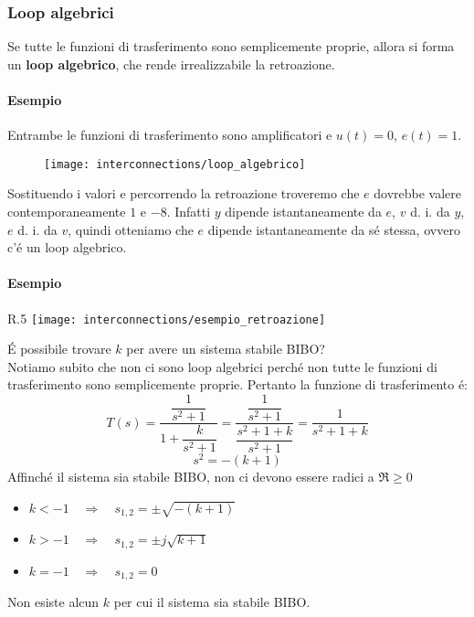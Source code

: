 \documentclass[../main.tex]{subfiles}
\begin{document}
	\subsubsection{Loop algebrici}
		Se tutte le funzioni di trasferimento sono semplicemente proprie, allora si forma un \textbf{loop algebrico}, che rende irrealizzabile la retroazione.
		
		\begin{mdframed}[style=Esempio]
			\paragraph{Esempio}
			Entrambe le funzioni di trasferimento sono amplificatori e $ u(t) = 0 $, $ e(t) =1 $.
			
			\begin{figure}[H]
				\centering
				\texttt{[image: interconnections/loop\_algebrico]}
			\end{figure}
		
			Sostituendo i valori e percorrendo la retroazione troveremo che $ e $ dovrebbe valere contemporaneamente $ 1 $ e $ -8 $. Infatti $ y $ dipende istantaneamente da $ e $, $ v $ d. i. da $ y $, $ e $ d. i. da $ v $, quindi otteniamo che $ e $ dipende istantaneamente da s\'e stessa, ovvero c'\'e un loop algebrico.
		\end{mdframed}
	
		\begin{mdframed}[style=Esempio]
			\paragraph{Esempio}
			\begin{wrapfigure}{R}{.5\linewidth}%
				\centering
				\texttt{[image: interconnections/esempio\_retroazione]}%
			\end{wrapfigure}
			\leavevmode%
			\'E possibile trovare $ k $ per avere un sistema stabile BIBO?\\
			Notiamo subito che non ci sono loop algebrici perch\'e non tutte le funzioni di trasferimento sono semplicemente proprie. Pertanto la funzione di trasferimento \'e:
			\[
				T(s) = \dfrac{\dfrac{1}{s^2+1}}{1 + \dfrac{k}{s^2+1}} =
				\dfrac{\dfrac{1}{s^2+1}}{\dfrac{s^2+1+k}{s^2+1}} = 
				\dfrac{1}{s^2+1+k}
			\]
			\[ 
				s^2 = -(k+1)
			\]
			Affinch\'e il sistema sia stabile BIBO, non ci devono essere radici a $ \Re \geq 0 $
			\begin{itemize}
				\item 
					$ k<-1 \quad \Rightarrow \quad s_{1,2} = \pm \sqrt{-(k+1)} $
				\item
					$ k>-1 \quad \Rightarrow \quad s_{1,2} = \pm j \sqrt{k+1} $
				\item 
					$ k=-1 \quad \Rightarrow \quad s_{1,2} = 0 $
			\end{itemize}
			Non esiste alcun $ k $ per cui il sistema sia stabile BIBO.
		\end{mdframed}

		
\end{document}
